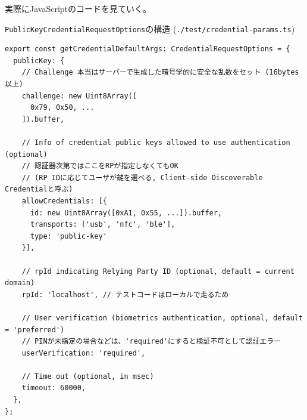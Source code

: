 \documentclass[12pt,dvipdfmx,uplatex]{beamer}
\begin{document}
\begin{frame}[fragile]
実際にJavaScriptのコードを見ていく。
\begin{exampleblock}{\scriptsize \texttt{PublicKeyCredentialRequestOptions}の構造 (\texttt{./test/credential-params.ts})}
\tiny
\begin{verbatim}
export const getCredentialDefaultArgs: CredentialRequestOptions = {
  publicKey: {
    // Challenge 本当はサーバーで生成した暗号学的に安全な乱数をセット (16bytes以上)
    challenge: new Uint8Array([
      0x79, 0x50, ...
    ]).buffer,

    // Info of credential public keys allowed to use authentication (optional)
    // 認証器次第ではここをRPが指定しなくてもOK
    // (RP IDに応じてユーザが鍵を選べる, Client-side Discoverable Credentialと呼ぶ)
    allowCredentials: [{
      id: new Uint8Array([0xA1, 0x55, ...]).buffer,
      transports: ['usb', 'nfc', 'ble'],
      type: 'public-key'
    }],

    // rpId indicating Relying Party ID (optional, default = current domain)
    rpId: 'localhost', // テストコードはローカルで走るため

    // User verification (biometrics authentication, optional, default = 'preferred')
    // PINが未指定の場合などは、'required'にすると検証不可として認証エラー
    userVerification: 'required',

    // Time out (optional, in msec)
    timeout: 60000,
  },
};
\end{verbatim}
\end{exampleblock}
 
\end{frame}
\end{document}
